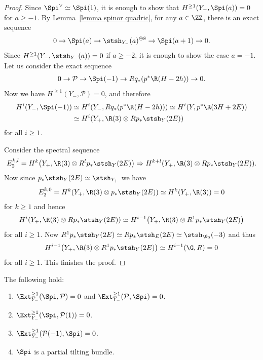 \begin{proof}
Since $\Spi^{\vee} \simeq \Spi(1)$, it is enough to show that $H^{\geq 1}(Y_-, \Spi(a)) = 0$ for $a \geq -1$.
By Lemma~\ref{lemma spinor quadric}, for any $a \in \ZZ$, there is an exact sequence
\begin{gather*}
0 \to \Spi(a) \to \stsh_{Y_-}(a)^{\oplus 8} \to \Spi(a+1) \to 0.
\end{gather*}
Since $H^{\geq 1}(Y_-, \stsh_{Y_-}(a)) = 0$ if $a \geq -2$, it is enough to show the case $a = -1$.
Let us consider the exact sequence
\begin{gather*}
0 \to \mathcal{P} \to \Spi(-1) \to Rq_*(p^*\R(H-2h)) \to 0.
\end{gather*}
Now we have $H^{\geq 1}(Y_-, \mathcal{P}) = 0$, and
therefore
\begin{align*}
H^i(Y_-, \Spi(-1)) &\simeq H^i(Y_-, Rq_*(p^*\R(H-2h)))
\simeq H^i(Y, p^*\R(3H+2E)) \\
&\simeq H^i(Y_+, \R(3) \otimes Rp_*\stsh_Y(2E))
\end{align*}
for all $i \geq 1$.

Consider the spectral sequence
\begin{gather*}
E_2^{k,l} = H^k\big(Y_+, \R(3) \otimes R^lp_*\stsh_Y(2E)\big) \Rightarrow H^{k+l}(Y_+, \R(3) \otimes Rp_*\stsh_Y(2E)).
\end{gather*}
Now since $p_*\stsh_Y(2E) \simeq \stsh_{Y_+}$ we have
\begin{gather*}
E_2^{k, 0} = H^k(Y_+, \R(3) \otimes p_*\stsh_Y(2E)) \simeq H^k(Y_+, \R(3)) = 0
\end{gather*}
for $k \geq 1$ and hence
\begin{gather*}
H^i(Y_+, \R(3) \otimes Rp_*\stsh_Y(2E)) \simeq H^{i-1}\big(Y_+, \R(3) \otimes R^1p_*\stsh_Y(2E)\big)
\end{gather*}
for all $i \geq 1$.
Now $R^1p_*\stsh_Y(2E) \simeq Rp_*\stsh_E(2E) \simeq \stsh_{\G_0}(-3)$ and thus
\begin{gather*}
H^{i-1}\big(Y_+, \R(3) \otimes R^1p_*\stsh_Y(2E)\big) \simeq H^{i-1}(\G, R) = 0
\end{gather*}
for all $i \geq 1$. This finishes the proof.
\end{proof}

\begin{Theorem}
The following hold:
\begin{enumerate}\itemsep=0pt
\item[$1.$] $\Ext_{Y_-}^{\geq 1}(\Spi, \mathcal{P}) = 0$ and $\Ext_{Y_-}^{\geq 1}(\mathcal{P}, \Spi) = 0$.
\item[$2.$] $\Ext_{Y_-}^{\geq 1}(\Spi, \mathcal{P}(1)) = 0$.
\item[$3.$] $\Ext_{Y_-}^{\geq 1}(\mathcal{P}(-1), \Spi) = 0$.
\item[$4.$] $\Spi$ is a partial tilting bundle.
\end{enumerate}
\end{Theorem}

